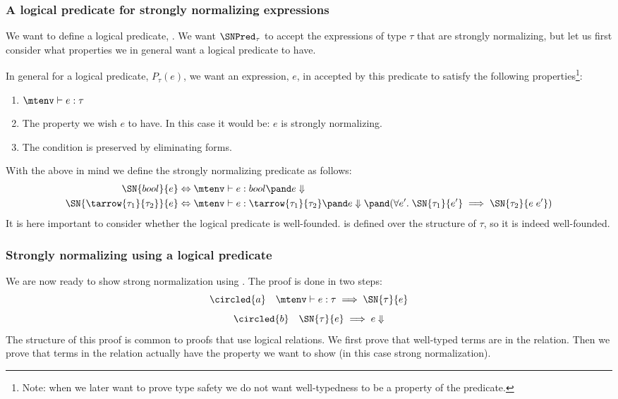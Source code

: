 \subsubsection*{A logical predicate for strongly normalizing expressions}
We want to define a logical predicate, . We want $\SNPred_\tau$ to accept the expressions of type $\tau$ that are strongly normalizing, but let us first consider what properties we in general want a logical predicate to have.

In general for a logical predicate, $P_\tau(e)$, we want an expression, $e$, in accepted by this predicate to satisfy the following properties\footnote{Note: when we later want to prove type safety we do not want well-typedness to be a property of the predicate.}:
\begin{enumerate}
\item $\mtenv \vdash e : \tau$
\item The property we wish $e$ to have. In this case it would be: $e$ is strongly normalizing.
\item The condition is preserved by eliminating forms.
\end{enumerate}
With the above in mind we define the strongly normalizing predicate as follows:
\begin{align*}
  \SN{bool}{e} & \Leftrightarrow \mtenv \vdash e : bool \pand e \Downarrow \\
  \SN{\tarrow{\tau_1}{\tau_2}}{e} & \Leftrightarrow \mtenv \vdash e : \tarrow{\tau_1}{\tau_2} \pand e \Downarrow \pand (\forall e'. \; \SN{\tau_1}{e'} \implies \SN{\tau_2}{e \; e'})\\
\end{align*}
It is here important to consider whether the logical predicate is well-founded.  is defined over the structure of $\tau$, so it is indeed well-founded.
\subsubsection*{Strongly normalizing using a logical predicate}
We are now ready to show strong normalization using . The proof is done in two steps:
\[
\circled{a} \quad \mtenv \vdash e : \tau \implies \SN{\tau}{e}
\]
\[
\circled{b} \quad \SN{\tau}{e} \implies e \Downarrow
\]
The structure of this proof is common to proofs that use logical relations. We first prove that well-typed terms are in the relation. Then we prove that terms in the relation actually have the property we want to show (in this case strong normalization).

